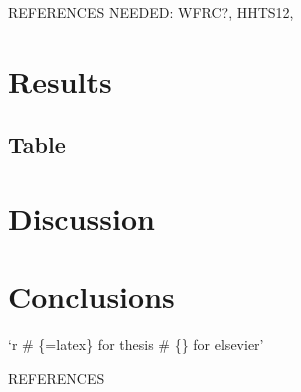 \documentclass[12pt, oneside, openright]{byuthesis}
\begin{document}
REFERENCES NEEDED: WFRC?, HHTS12,

\hypertarget{results}{%
\chapter{Results}\label{results}}

\hypertarget{table}{%
\section{Table}\label{table}}

\hypertarget{discussion}{%
\chapter{Discussion}\label{discussion}}

\hypertarget{conclusions}{%
\chapter{Conclusions}\label{conclusions}}

`r
\# \{=latex\} for thesis
\# \{\} for elsevier'

\cleardoublepage
    \begin{centering}
    REFERENCES\\
     \baselineskip
    \end{centering}
    
\end{document}

